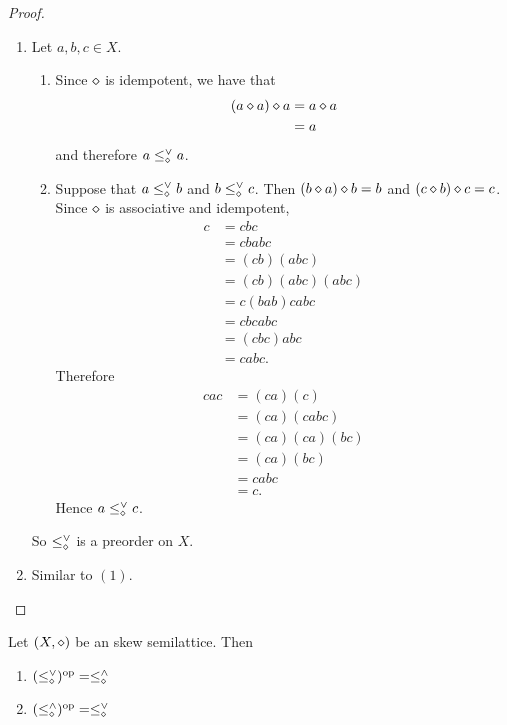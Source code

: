 \documentclass{book}
\begin{document}
	\begin{proof}\
		\begin{enumerate}
			\item Let $a,b,c \in X$.
			\begin{enumerate}
				\item Since $\diamond$ is idempotent, we have that 
				\begin{align*}
					(a \diamond a) \diamond a
					& = a \diamond a \\
					& = a
				\end{align*}
				and therefore $a \leq^{\vee}_{\diamond} a$. 
				\item Suppose that $a \leq^{\vee}_{\diamond} b$ and $b \leq^{\vee}_{\diamond} c$. Then $(b \diamond a) \diamond b = b$ and $(c \diamond b) \diamond c = c$. Since $\diamond$ is associative and idempotent,
				\begin{align*}
					c 
					& = cbc \\
					& = cbabc \\
					& = (cb)(abc) \\
					& = (cb)(abc)(abc) \\
					& = c(bab)cabc \\
					& = cbcabc \\
					& = (cbc)abc \\
					& = cabc.
				\end{align*}
				Therefore 
				\begin{align*}
					cac
					& = (ca)(c) \\
					& = (ca)(cabc) \\
					& = (ca)(ca)(bc) \\
					& = (ca)(bc) \\
					& = cabc \\
					& = c. 
				\end{align*}
				Hence $a \leq^{\vee}_{\diamond} c$.
			\end{enumerate}
			So $\leq^{\vee}_{\diamond}$ is a preorder on $X$.
			\item Similar to $(1)$.
		\end{enumerate}
	\end{proof}
	
	\begin{ex} 
		Let $(X, \diamond)$ be an skew semilattice. Then 
		\begin{enumerate}
			\item $(\leq^{\vee}_{\diamond})^{\text{op}} = \leq^{\wedge}_{\diamond}$
			\item $(\leq^{\wedge}_{\diamond})^{\text{op}} = \leq^{\vee}_{\diamond}$
		\end{enumerate}
	\end{ex}
	
\end{document}
